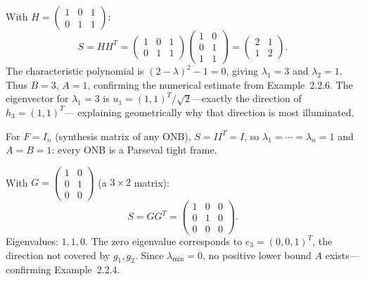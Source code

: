 \begin{examplebox}[title={Example 3.3: Non-tight frame $\{h_1,h_2,h_3\}$}]
\label{ex:frame-op-h}
With $H=\begin{pmatrix}1&0&1\\0&1&1\end{pmatrix}$:
\[
  S = HH^T
  = \begin{pmatrix}1&0&1\\0&1&1\end{pmatrix}
    \begin{pmatrix}1&0\\0&1\\1&1\end{pmatrix}
  = \begin{pmatrix}2&1\\1&2\end{pmatrix}.
\]
The characteristic polynomial is $(2-\lambda)^2-1=0$, giving
$\lambda_{1}=3$ and $\lambda_{2}=1$. Thus $B=3$, $A=1$, confirming the
numerical estimate from Example~2.2.6. The eigenvector for $\lambda_1=3$
is $u_1=(1,1)^T/\sqrt{2}$---exactly the direction of $h_3=(1,1)^T$---
explaining geometrically why that direction is most illuminated.
\end{examplebox}

\begin{examplebox}[title={Example 3.4: Standard orthonormal basis}]
\label{ex:frame-op-onb}
For $F=I_n$ (synthesis matrix of any ONB), $S=II^T=I$, so
$\lambda_1=\cdots=\lambda_n=1$ and $A=B=1$: every ONB is a Parseval
tight frame.
\end{examplebox}

\begin{examplebox}[title={Example 3.5: Non-spanning set $\{g_1,g_2\}$ in $\R^3$}]
\label{ex:frame-op-nonspan}
With $G=\begin{pmatrix}1&0\\0&1\\0&0\end{pmatrix}$ (a $3\times 2$
matrix):
\[
  S=GG^T = \begin{pmatrix}1&0&0\\0&1&0\\0&0&0\end{pmatrix}.
\]
Eigenvalues: $1,1,0$. The zero eigenvalue corresponds to $e_3=(0,0,1)^T$,
the direction not covered by $g_1,g_2$. Since $\lambda_{\min}=0$, no
positive lower bound $A$ exists---confirming Example~2.2.4.
\end{examplebox}

